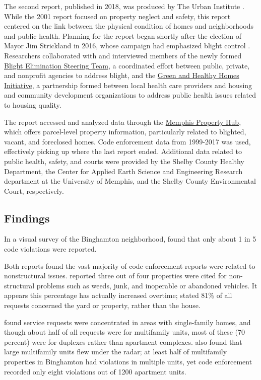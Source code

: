 \documentclass[
]{book}
\begin{document}
The second report, published in 2018, was produced by The Urban Institute \citep{stacy2018}. While the 2001 report focused on property neglect and safety, this report centered on the link between the physical condition of homes and neighborhoods and public health. Planning for the report began shortly after the election of Mayor Jim Strickland in 2016, whose campaign had emphasized blight control \citep{baker2018}. Researchers collaborated with and interviewed members of the newly formed \href{http://memphisfightsblight.com/blight-elimination-steering-team/}{Blight Elimination Steering Team}, a coordinated effort between public, private, and nonprofit agencies to address blight, and the \href{https://www.greenandhealthyhomes.org/location/memphis-tn/}{Green and Healthy Homes Initiative}, a partnership formed between local health care providers and housing and community development organizations to address public health issues related to housing quality.

The report accessed and analyzed data through the \href{http://memphisfightsblight.com/programs/mph/}{Memphis Property Hub}, which offers parcel-level property information, particularly related to blighted, vacant, and foreclosed homes. Code enforcement data from 1999-2017 was used, effectively picking up where the last report ended. Additional data related to public health, safety, and courts were provided by the Shelby County Healthy Department, the Center for Applied Earth Science and Engineering Research department at the University of Memphis, and the Shelby County Environmental Court, respectively.

\hypertarget{findings}{%
\subsection{Findings}\label{findings}}

In a visual survey of the Binghamton neighborhood, \citet{betts2001} found that only about 1 in 5 code violations were reported.

Both reports found the vast majority of code enforcement reports were related to nonstructural issues. \citet{betts2001} reported three out of four properties were cited for non-structural problems such as weeds, junk, and inoperable or abandoned vehicles. It appears this percentage has actually increased overtime; \citet{stacy2018} stated 81\% of all requests concerned the yard or property, rather than the house.

\citet{stacy2018} found service requests were concentrated in areas with single-family homes, and though about half of all requests were for multifamily units, most of these (70 percent) were for duplexes rather than apartment complexes. \citet{betts2001} also found that large multifamily units flew under the radar; at least half of multifamily properties in Binghamton had violations in multiple units, yet code enforcement recorded only eight violations out of 1200 apartment units.
\end{document}
